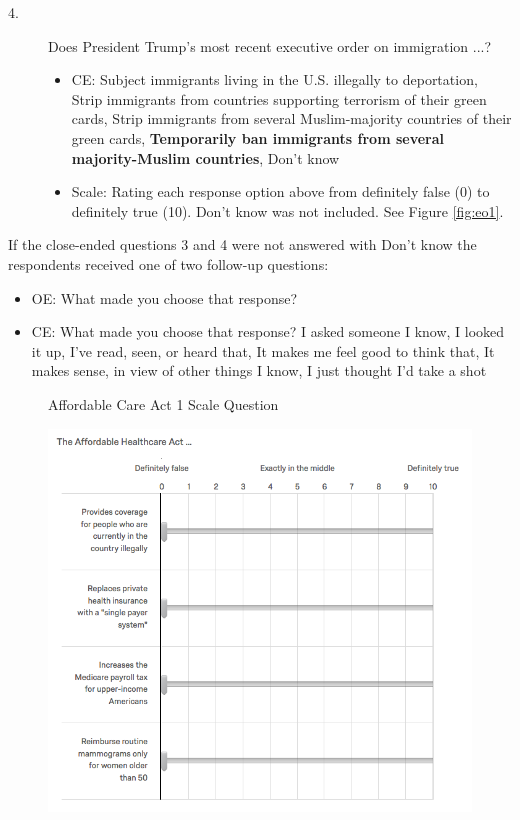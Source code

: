 \begin{description}
\begin{itemize}
    \end{itemize}
        \item[4.] Does President Trump’s most recent executive order on immigration ...?
  \begin{itemize}
  \item  CE: Subject immigrants living in the U.S. illegally to deportation, Strip immigrants from countries supporting terrorism of their green cards, Strip immigrants from several Muslim-majority countries of their green cards, \textbf{Temporarily ban immigrants from several majority-Muslim countries}, Don’t know
    \item  Scale: Rating each response option above from definitely false (0) to definitely true (10). Don't know was not included. See Figure \ref{fig:eo1}.
    \end{itemize}
    \end{description}

If the close-ended questions 3 and 4 were not answered with Don’t know the respondents received one of two follow-up questions:
\begin{itemize}
\item OE: What made you choose that response?
 \item CE: What made you choose that response? I asked someone I know, I looked it up, I've read, seen, or heard that, It makes me feel good to think that, It makes sense, in view of other things I know, I just thought I’d take a shot
\end{itemize}

\begin{center}
	\begin{figure}[H]
		\centering
		\caption{Affordable Care Act 1 Scale Question}
		\includegraphics[width=\textwidth]{../figs/hk_aca1.png}
		\label{fig:aca1}
		\caption*{\footnotesize }
	\end{figure}
\end{center}


